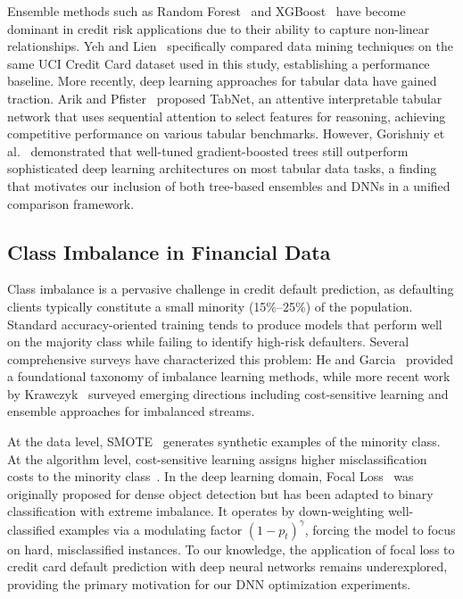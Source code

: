 \documentclass[conference]{IEEEtran}
\begin{document}
Ensemble methods such as Random Forest~\cite{breiman2001random} and XGBoost~\cite{chen2016xgboost} have become dominant in credit risk applications due to their ability to capture non-linear relationships. Yeh and Lien~\cite{yeh2009comparisons} specifically compared data mining techniques on the same UCI Credit Card dataset used in this study, establishing a performance baseline. More recently, deep learning approaches for tabular data have gained traction. Arik and Pfister~\cite{arik2021tabnet} proposed TabNet, an attentive interpretable tabular network that uses sequential attention to select features for reasoning, achieving competitive performance on various tabular benchmarks. However, Gorishniy et al.~\cite{gorishniy2021revisiting} demonstrated that well-tuned gradient-boosted trees still outperform sophisticated deep learning architectures on most tabular data tasks, a finding that motivates our inclusion of both tree-based ensembles and DNNs in a unified comparison framework.

\subsection{Class Imbalance in Financial Data}
Class imbalance is a pervasive challenge in credit default prediction, as defaulting clients typically constitute a small minority (15\%--25\%) of the population. Standard accuracy-oriented training tends to produce models that perform well on the majority class while failing to identify high-risk defaulters. Several comprehensive surveys have characterized this problem: He and Garcia~\cite{he2009learning} provided a foundational taxonomy of imbalance learning methods, while more recent work by Krawczyk~\cite{krawczyk2016learning} surveyed emerging directions including cost-sensitive learning and ensemble approaches for imbalanced streams.

At the data level, SMOTE~\cite{chawla2002smote} generates synthetic examples of the minority class. At the algorithm level, cost-sensitive learning assigns higher misclassification costs to the minority class~\cite{elkan2001foundations}. In the deep learning domain, Focal Loss~\cite{lin2017focal} was originally proposed for dense object detection but has been adapted to binary classification with extreme imbalance. It operates by down-weighting well-classified examples via a modulating factor $(1-p_t)^\gamma$, forcing the model to focus on hard, misclassified instances. To our knowledge, the application of focal loss to credit card default prediction with deep neural networks remains underexplored, providing the primary motivation for our DNN optimization experiments.
\end{document}
